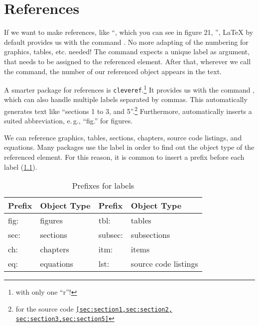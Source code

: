 \chapter{References}
\label{sec:references}

If we want to make references, like \enquote{\textellipsis , which you can see in figure 21, \textellipsis}, \LaTeX{} by default provides us with the command \replaced[id=F]{\texttt{\ref{<label>}}}{\texttt{\ref{label}}}. No more adapting of the numbering for graphics, tables, etc. needed!
The command expects a unique label as argument, that needs to be assigned to 
the referenced element. After that, wherever we call the command, the number of 
our referenced object appears in the text.

A smarter package for references is \texttt{cleveref}.\footnote{with only one \enquote{r}!}
It provides us with the command \replaced[id=F]{\texttt{\ref{<label>}}}{\texttt{\ref{label}}}, which can also handle multiple labels separated by commas.
This automatically generates text like \enquote{sections 1 to 3, and 5}.\footnote{for the source code \texttt{\cref{sec:section1,sec:section2,
sec:section3,sec:section5}}}
Furthermore, \replaced[id=F]{\texttt{\ref{<label>}}}{\texttt{\ref{label}}} automatically inserts a suited abbreviation, e.\,g., \enquote{fig.} for figures.

We can reference graphics, tables, sections, chapters, source code listings, and equations. 
Many packages use the label in order to find out the object type of the referenced element.
For this reason, it is common to insert a prefix before each label (\cref{lst:reference-prefixes}).

\begin{table}[H]
  \centering
  \begin{tabular}{@{}llll@{}}
    \toprule
    Prefix & Object Type & Prefix & Object Type \\ \midrule
    fig: & figures & tbl:    & tables            \\ 
    sec: & sections  & subsec: & subsections     \\
    ch:  & chapters     & itm:    & items \\
    eq:  & equations & lst:    & source code listings  \\ \bottomrule
  \end{tabular}
  \caption{Prefixes for labels}
  \label{lst:reference-prefixes}
\end{table}

